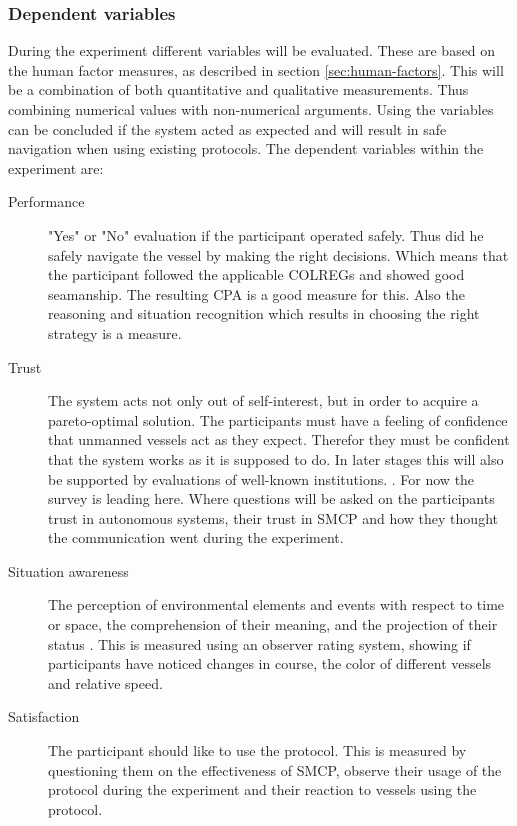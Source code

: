 \subsubsection{Dependent variables}
During the experiment different variables will be evaluated. These are based on the human factor measures, as described in section \ref{sec:human-factors}. This will be a combination of both quantitative and qualitative measurements. Thus combining numerical values with non-numerical arguments. 
Using the variables can be concluded if the system acted as expected and will result in safe navigation when using existing protocols. The dependent variables within the experiment are:
\begin{description}
	\item [Performance] "Yes" or "No" evaluation if the participant operated safely. Thus did he safely navigate the vessel by making the right decisions. Which means that the participant followed the applicable \ac{COLREGs} and showed good seamanship. The resulting \acf{CPA} is a good measure for this. Also the reasoning and situation recognition which results in choosing the right strategy is a measure.
	
	\item [Trust] The system acts not only out of self-interest, but in order to acquire a pareto-optimal solution. The participants must have a feeling of confidence that unmanned vessels act as they expect. Therefor they must be confident that the system works as it is supposed to do. In later stages this will also be supported by evaluations of well-known institutions. \cite{Ozawa2013}.
	For now the survey is leading here. Where questions will be asked on the participants trust in autonomous systems, their trust in SMCP and how they thought the communication went during the experiment.
	
	\item [Situation awareness] The perception of environmental elements and events with respect to time or space, the comprehension of their meaning, and the projection of their status \cite{Naderpour2016}. This is measured using an observer rating system, showing if participants have noticed changes in course, the color of different vessels and relative speed.
	
	\item [Satisfaction] The participant should like to use the protocol. This is measured by questioning them on the effectiveness of \ac{SMCP}, observe their usage of the protocol during the experiment and their reaction to vessels using the protocol.
\end{description}

